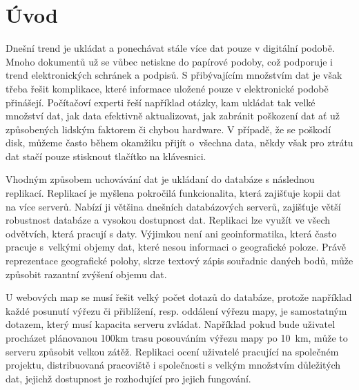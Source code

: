 \section{Úvod}
Dnešní trend je ukládat a ponechávat stále více dat pouze v digitální podobě. Mnoho dokumentů už se vůbec netiskne do papírové podoby, což podporuje i trend e\-le\-ktro\-nic\-kých schránek a podpisů. S přibývajícím množstvím dat je však třeba řešit komplikace, které informace uložené pouze v elektronické podobě přinášejí. Počítačoví experti řeší například otázky, kam ukládat tak velké množství dat, jak data efektivně aktualizovat, jak zabránit poškození dat ať už způsobených lidským faktorem či chybou hardware. V případě, že se poškodí disk, můžeme často během okamžiku přijít o~všechna data, někdy však pro ztrátu dat stačí pouze stisknout tlačítko na klávesnici.

Vhodným způsobem uchovávání dat je ukládaní do databáze s následnou replikací. Replikací je myšlena pokročilá funkcionalita, která zajišťuje kopii dat na více serverů. Nabízí ji většina dnešních databázových serverů, zajišťuje větší robustnost databáze a vysokou dostupnost dat. Replikaci lze využít ve všech odvětvích, která pracují s daty. Výjimkou není ani geoinformatika, která často pracuje s~velkými objemy dat, které nesou informaci o geografické poloze. Právě reprezentace geografické polohy, skrze textový zápis souřadnic daných bodů, může způsobit razantní zvýšení objemu dat. 

U webových map se musí řešit velký počet dotazů do databáze, protože například každé posunutí výřezu či přiblížení, resp. oddálení výřezu mapy, je samostatným dotazem, který musí kapacita serveru zvládat. Například pokud bude uživatel procházet plánovanou 100km trasu posouváním výřezu mapy po 10~km, může to serveru způsobit velkou zátěž. Replikaci ocení uživatelé pracující na společném projektu, distribuovaná pra\-co\-viš\-tě i společnosti s velkým množstvím důležitých dat, jejichž dostupnost je rozhodující pro jejich fungování. 


